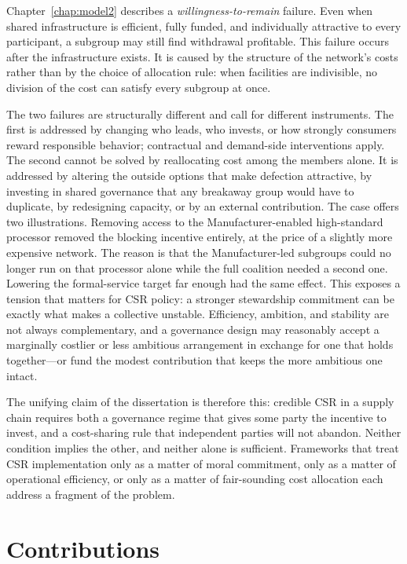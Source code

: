 Chapter~\ref{chap:model2} describes a \emph{willingness-to-remain} failure. Even when shared infrastructure is efficient, fully funded, and individually attractive to every participant, a subgroup may still find withdrawal profitable. This failure occurs after the infrastructure exists. It is caused by the structure of the network's costs rather than by the choice of allocation rule: when facilities are indivisible, no division of the cost can satisfy every subgroup at once.

The two failures are structurally different and call for different instruments. The first is addressed by changing who leads, who invests, or how strongly consumers reward responsible behavior; contractual and demand-side interventions apply. The second cannot be solved by reallocating cost among the members alone. It is addressed by altering the outside options that make defection attractive, by investing in shared governance that any breakaway group would have to duplicate, by redesigning capacity, or by an external contribution. The case offers two illustrations. Removing access to the Manufacturer-enabled high-standard processor removed the blocking incentive entirely, at the price of a slightly more expensive network. The reason is that the Manufacturer-led subgroups could no longer run on that processor alone while the full coalition needed a second one. Lowering the formal-service target far enough had the same effect. This exposes a tension that matters for CSR policy: a stronger stewardship commitment can be exactly what makes a collective unstable. Efficiency, ambition, and stability are not always complementary, and a governance design may reasonably accept a marginally costlier or less ambitious arrangement in exchange for one that holds together---or fund the modest contribution that keeps the more ambitious one intact.

The unifying claim of the dissertation is therefore this: credible CSR in a supply chain requires both a governance regime that gives some party the incentive to invest, and a cost-sharing rule that independent parties will not abandon. Neither condition implies the other, and neither alone is sufficient. Frameworks that treat CSR implementation only as a matter of moral commitment, only as a matter of operational efficiency, or only as a matter of fair-sounding cost allocation each address a fragment of the problem.

\section{Contributions}
\label{sec:ch5_contributions}

